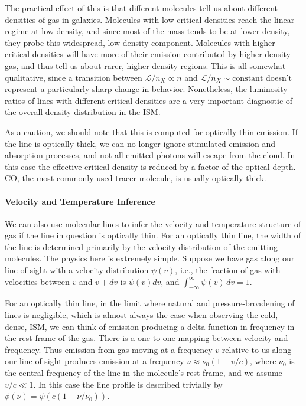 The practical effect of this is that different molecules tell us about different densities of gas in galaxies. Molecules with low critical densities reach the linear regime at low density, and since most of the mass tends to be at lower density, they probe this widespread, low-density component. Molecules with higher critical densities will have more of their emission contributed by higher density gas, and thus tell us about rarer, higher-density regions. This is all somewhat qualitative, since a transition between $\mathcal{L}/n_X \propto n$ and $\mathcal{L}/n_X \sim\mbox{constant}$ doesn't represent a particularly sharp change in behavior. Nonetheless, the luminosity ratios of lines with different critical densities are a very important diagnostic of the overall density distribution in the ISM.

As a caution, we should note that this is computed for optically thin emission. If the line is optically thick, we can no longer ignore stimulated emission and absorption processes, and not all emitted photons will escape from the cloud. In this case the effective critical density is reduced by a factor of the optical depth. CO, the most-commonly used tracer molecule, is usually optically thick.

\paragraph{Velocity and Temperature Inference}

We can also use molecular lines to infer the velocity and temperature structure of gas if the line in question is optically thin. For an optically thin line, the width of the line is determined primarily by the velocity distribution of the emitting molecules. The physics here is extremely simple. Suppose we have gas along our line of sight with a velocity distribution $\psi(v)$, i.e., the fraction of gas with velocities between $v$ and $v+dv$ is $\psi(v) dv$, and $\int_{-\infty}^{\infty} \psi(v) \, dv = 1$.

For an optically thin line, in the limit where natural and pressure-broadening of lines is negligible, which is almost always the case when observing the cold, dense, ISM, we can think of emission producing a delta function in frequency in the rest frame of the gas. There is a one-to-one mapping between velocity and frequency. Thus emission from gas moving at a frequency $v$ relative to us along our line of sight produces emission at a frequency $\nu \approx \nu_0 (1 - v/c)$, where $\nu_0$ is the central frequency of the line in the molecule's rest frame, and we assume $v/c \ll 1$. In this case the line profile is described trivially by $\phi(\nu)=\psi(c(1-\nu/\nu_0))$. 

